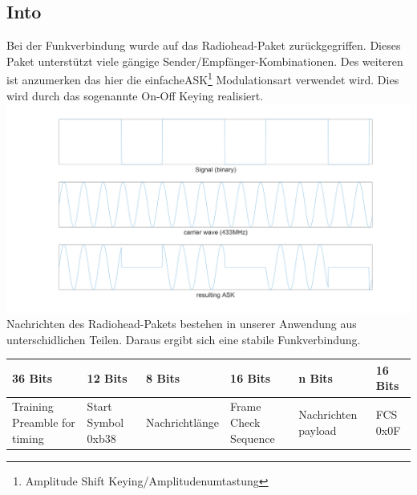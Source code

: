 \subsection{Into}
Bei der Funkverbindung wurde auf das Radiohead-Paket\cite{rh} zurückgegriffen. Dieses Paket unterstützt viele gängige Sender/Empfänger-Kombinationen. Des weiteren ist anzumerken das hier die \grqq einfache\grqq  ASK\footnote{Amplitude Shift Keying/Amplitudenumtastung} Modulationsart verwendet wird. Dies wird durch das sogenannte On-Off Keying realisiert. \newline\includegraphics[width=\textwidth]{Hauptteil/sw/intro/ask.png}
Nachrichten des Radiohead-Pakets bestehen in unserer Anwendung aus unterschidlichen Teilen. Daraus ergibt sich eine stabile Funkverbindung.\\
\begin{tabularx}{\textwidth}{|X|X|l|X|X|X|}
\hline
 36 Bits & 12 Bits & 8 Bits & 16 Bits & n Bits & 16 Bits\\
\hline
Training Preamble for timing & Start Symbol 0xb38 & Nachrichtlänge & Frame Check Sequence & Nachrichten payload & FCS 0x0F\\
\hline
\end{tabularx}